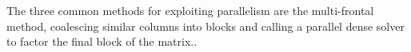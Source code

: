 \documentclass[acmtocl]{acmtrans2m}
\begin{document}


The three common methods for exploiting parallelism are the
multi-frontal method, coalescing  similar 
columns into blocks and calling a parallel dense solver 
to factor the final block of the matrix.\cite{amestoy01analysis}.

%


%
\end{document}

